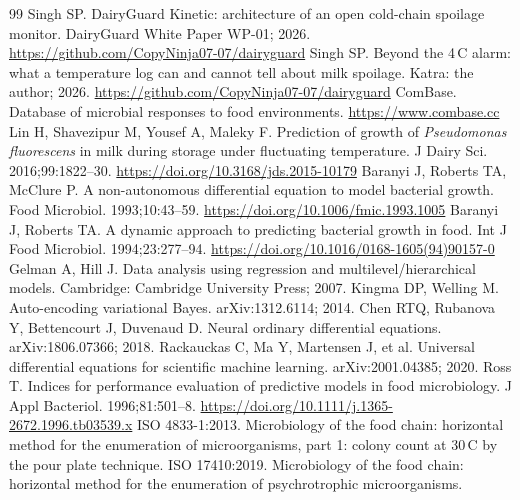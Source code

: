 \begin{thebibliography}{99}\small\setlength{\itemsep}{1pt}
 Singh SP. DairyGuard Kinetic: architecture of an open cold-chain spoilage monitor. DairyGuard White Paper WP-01; 2026. \url{https://github.com/CopyNinja07-07/dairyguard}
 Singh SP. Beyond the 4\,\textdegree C alarm: what a temperature log can and cannot tell about milk spoilage. Katra: the author; 2026. \url{https://github.com/CopyNinja07-07/dairyguard}
 ComBase. Database of microbial responses to food environments. \url{https://www.combase.cc}
 Lin H, Shavezipur M, Yousef A, Maleky F. Prediction of growth of \textit{Pseudomonas fluorescens} in milk during storage under fluctuating temperature. J Dairy Sci. 2016;99:1822--30. \url{https://doi.org/10.3168/jds.2015-10179}
 Baranyi J, Roberts TA, McClure P. A non-autonomous differential equation to model bacterial growth. Food Microbiol. 1993;10:43--59. \url{https://doi.org/10.1006/fmic.1993.1005}
 Baranyi J, Roberts TA. A dynamic approach to predicting bacterial growth in food. Int J Food Microbiol. 1994;23:277--94. \url{https://doi.org/10.1016/0168-1605(94)90157-0}
 Gelman A, Hill J. Data analysis using regression and multilevel/hierarchical models. Cambridge: Cambridge University Press; 2007.
 Kingma DP, Welling M. Auto-encoding variational Bayes. arXiv:1312.6114; 2014.
 Chen RTQ, Rubanova Y, Bettencourt J, Duvenaud D. Neural ordinary differential equations. arXiv:1806.07366; 2018.
 Rackauckas C, Ma Y, Martensen J, et al. Universal differential equations for scientific machine learning. arXiv:2001.04385; 2020.
 Ross T. Indices for performance evaluation of predictive models in food microbiology. J Appl Bacteriol. 1996;81:501--8. \url{https://doi.org/10.1111/j.1365-2672.1996.tb03539.x}
 ISO 4833-1:2013. Microbiology of the food chain: horizontal method for the enumeration of microorganisms, part 1: colony count at 30\,\textdegree C by the pour plate technique.
 ISO 17410:2019. Microbiology of the food chain: horizontal method for the enumeration of psychrotrophic microorganisms.
\end{thebibliography}

